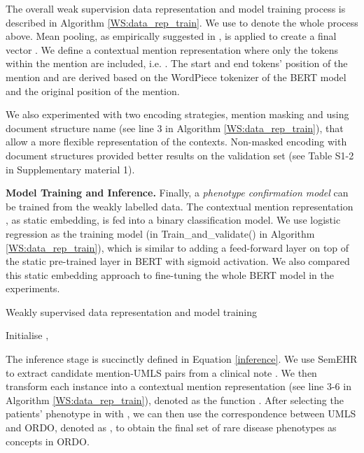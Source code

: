\documentclass[twocolumn]{bmcart}
\begin{document}
The overall weak supervision data representation and model training process is described in Algorithm \ref{WS:data_rep_train}. We use  to denote the whole process above. Mean pooling, as empirically suggested in \cite{ma2019universal}, is applied to create a final vector . We define a contextual mention representation where only the tokens within the mention are included, i.e. . The start and end tokens' position of the mention  and  are derived based on the WordPiece tokenizer of the BERT model and the original position of the mention.

We also experimented with two encoding strategies, mention masking and using document structure name  (see line 3 in Algorithm \ref{WS:data_rep_train}), that allow a more flexible representation of the contexts. Non-masked encoding with document structures provided better results on the validation set (see Table S1-2 in Supplementary material 1).

\textbf{Model Training and Inference.} Finally, a \emph{phenotype confirmation model} can be trained from the weakly labelled data. The contextual mention representation , as static embedding, is fed into a binary classification model. We use logistic regression as the training model (in Train\_and\_validate() in Algorithm \ref{WS:data_rep_train}), which is similar to adding a feed-forward layer on top of the static pre-trained layer in BERT with sigmoid activation. We also compared this static embedding approach to fine-tuning the whole BERT model in the experiments.

\begin{algorithm}[t]
\caption{Weakly supervised data representation and model training}

\label{WS:data_rep_train}
\SetAlgoLined
\KwRequire{}

Initialise , \;

\;
\end{algorithm}

The inference stage is succinctly defined in Equation \ref{inference}. We use SemEHR to extract candidate mention-UMLS pairs from a clinical note . We then transform each instance into a contextual mention representation (see line 3-6 in Algorithm \ref{WS:data_rep_train}), denoted as the function . After selecting the patients' phenotype in  with , we can then use the correspondence between UMLS and ORDO, denoted as , to obtain the final set of rare disease phenotypes  as concepts in ORDO.
\end{document}

